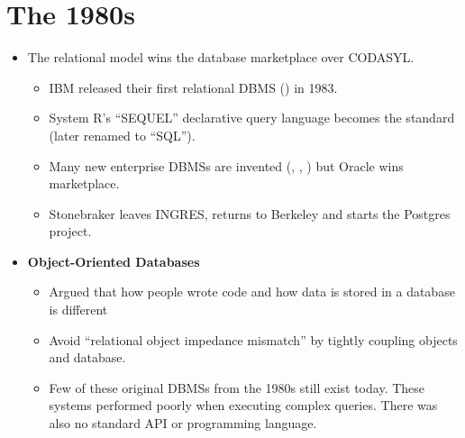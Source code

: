\documentclass[11pt]{article}
\begin{document}
\section{The 1980s}
\begin{itemize}
    \item The relational model wins the database marketplace over CODASYL.
    \begin{itemize}
        \item
        IBM released their first relational DBMS () in 1983.
        
        \item
        System R's ``SEQUEL'' declarative query language becomes the standard (later renamed to 
        ``SQL'').
        
        \item
        Many new enterprise DBMSs are invented (, , 
        ) but Oracle wins marketplace.
        
        \item
        Stonebraker leaves INGRES, returns to Berkeley and starts the Postgres project.
    \end{itemize}
    
    \item \textbf{Object-Oriented Databases}~\cite{zdonik89}
    \begin{itemize}
        \item
        Argued that how people wrote code and how data is stored in a database is different
        
        \item
        Avoid ``relational object impedance mismatch'' by tightly coupling objects and database.
        
        \item
        Few of these original DBMSs from the 1980s still exist today. These systems performed 
        poorly when executing complex queries. There was also no standard API or programming 
        language.
    \end{itemize}
\end{itemize}
\end{document}
